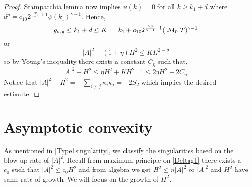 \begin{proof}
        Stampacchia lemma now implies $ \psi(k) = 0 $ for all $ k \ge k_{1}+d $ where $ d^{p} =c_{10}2^{ \frac{\gamma p}{\gamma-1}+1}\psi(k_{1})^{\gamma-1}  $. Hence, 
        \[ g_{\sigma,\eta} \le k_{1}+d\le K := k_{1}+ c_{10} 2^{ \frac{\gamma p}{\gamma-1}+1}(|\mathcal{M}_{0}|T)^{\gamma-1}\]
        or 
        \begin{equation*}
            |A|^{2}-(1+\eta)H^{2} \le KH^{2-\sigma}
        \end{equation*}
        so by Young's inequality there exists a constant $ C_{\eta} $ such that, \begin{equation*}
            |A|^{2}-H^{2}\le \eta H^{2}+KH^{2-\sigma} \le 2 \eta H^{2}+2C_{\eta}.
        \end{equation*}
        Notice that $ |A|^{2}-H^{2} = -\sum_{i\neq j}\kappa_{i}\kappa_{j} = -2S_{2} $ which implies the desired estimate.
    \end{proof}

    \section{Asymptotic convexity}
 
    As mentioned in \cref{Type1singularity}, we classify the singularities based on the blow-up rate of $ |A|^{2} $. Recall from maximum principle on \cref{Deltag1} there exists a $ c_{0} $ such that $ |A|^{2}\le c_{0}H^{2} $ and from algebra we get $ H^{2}\le n|A|^{2} $ so $ |A|^{2} $ and $ H^{2} $ have same rate of growth. We will focus on the growth of $ H^{2} $. 
    
